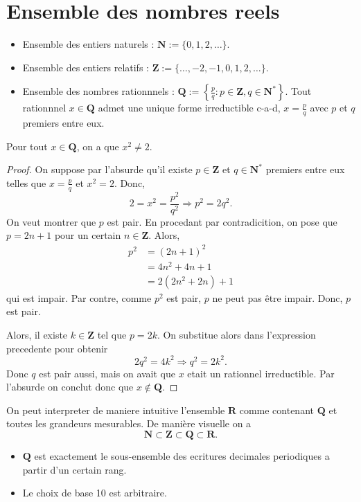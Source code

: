 \chapter{Ensemble des nombres reels}
\begin{reminder}
\begin{itemize}
\item Ensemble des entiers naturels : $\mathbf{N}:=\{ 0,1,2,\dots \}$.
\item Ensemble des entiers relatifs : $\mathbf{Z}:=\{ \dots,-2,-1,0,1,2,\dots \}$.
\item Ensemble des nombres rationnnels : $\mathbf{Q}:=\left\{  \frac{p}{q} :p \in \mathbf{Z},q\in \mathbf{N}^{*} \right\}$. Tout rationnnel $x \in \mathbf{Q}$ admet une unique forme irreductible c-a-d, $x=\frac{p}{q}$ avec $p$ et $q$ premiers entre eux. 
\end{itemize}
\end{reminder}
\begin{proposition}
Pour tout $x \in \mathbf{Q}$, on a que $x^{2}\neq2$.
\end{proposition}
\begin{proof}
On suppose par l'absurde qu'il existe $p \in \mathbf{Z}$ et $q\in \mathbf{N}^{*}$ premiers entre eux telles que $x=\frac{p}{q}$ et $x^{2}=2$. Donc,
$$
2=x^{2}=\frac{p^{2}}{q^{2}}\Rightarrow p^{2}=2q^{2}.
$$
On veut montrer que $p$ est pair. En procedant par contradicition, on pose que $p=2n+1$ pour un certain $n\in \mathbf{Z}$. Alors,
\begin{align*}
p^{2} & =(2n+1)^{2} \\
 & =4n^{2}+4n+1 \\
 & =2(2n^{2}+2n)+1
\end{align*}
qui est impair. Par contre, comme $p^{2}$ est pair, $p$ ne peut pas être impair. Donc, $p$ est pair.

Alors, il existe $k\in \mathbf{Z}$ tel que $p=2k$. On substitue alors dans l'expression precedente pour obtenir 
$$
2q^{2}=4k^{2}\Rightarrow q^{2}=2k^{2}.
$$
Donc $q$ est pair aussi, mais on avait que $x$ etait un rationnel irreductible. Par l'absurde on conclut donc que $x\not\in \mathbf{Q}$.
\end{proof}
On peut interpreter de maniere intuitive l'ensemble $\mathbf{R}$ comme contenant $\mathbf{Q}$ et toutes les grandeurs mesurables. De manière visuelle on a
$$
\mathbf{N}\subset \mathbf{Z}\subset \mathbf{Q}\subset \mathbf{R}.
$$
\begin{remark}
\begin{itemize}
\item $\mathbf{Q}$ est exactement le sous-ensemble des ecritures decimales periodiques a partir d'un certain rang.
\item Le choix de base 10 est arbitraire.
\end{itemize}
\end{remark}
